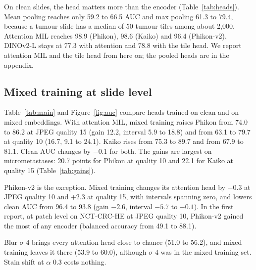 \documentclass[11pt,a4paper]{article}
\newcommand{\ra}{$\rightarrow$}
\begin{document}
On clean slides, the head matters more than the encoder (Table~\ref{tab:heads}). Mean pooling reaches only 59.2 to 66.5 AUC and max pooling 61.3 to 79.4, because a tumour slide has a median of 50 tumour tiles among about 2,000. Attention MIL reaches 98.9 (Phikon), 98.6 (Kaiko) and 96.4 (Phikon-v2). DINOv2-L stays at 77.3 with attention and 78.8 with the tile head. We report attention MIL and the tile head from here on; the pooled heads are in the appendix.

\begin{table}[h]\centering\small
\caption{Clean test slides, heads trained on clean embeddings. Slide AUC in \%, mean $\pm$ standard deviation over five seeds.}
\label{tab:heads}

\end{table}

\subsection{Mixed training at slide level}

Table~\ref{tab:main} and Figure~\ref{fig:auc} compare heads trained on clean and on mixed embeddings. With attention MIL, mixed training raises Phikon from 74.0 to 86.2 at JPEG quality 15 (gain 12.2, interval 5.9 to 18.8) and from 63.1 to 79.7 at quality 10 (16.7, 9.1 to 24.1). Kaiko rises from 75.3 to 89.7 and from 67.9 to 81.1. Clean AUC changes by $-0.1$ for both. The gains are largest on micrometastases: 20.7 points for Phikon at quality 10 and 22.1 for Kaiko at quality 15 (Table~\ref{tab:gains}).

Phikon-v2 is the exception. Mixed training changes its attention head by $-0.3$ at JPEG quality 10 and $+2.3$ at quality 15, with intervals spanning zero, and lowers clean AUC from 96.4 to 93.8 (gain $-2.6$, interval $-5.7$ to $-0.1$). In the first report, at patch level on NCT-CRC-HE at JPEG quality 10, Phikon-v2 gained the most of any encoder (balanced accuracy from 49.1 to 88.1).

Blur $\sigma$ 4 brings every attention head close to chance (51.0 to 56.2), and mixed training leaves it there (53.9 to 60.0), although $\sigma$ 4 was in the mixed training set. Stain shift at $\alpha$ 0.3 costs nothing.

\begin{table}[h]\centering\small
\caption{Slide AUC in \%, all 129 test slides, mean of five seeds: head trained on clean embeddings \ra{} head trained on mixed embeddings. JPEG Q10 was not in the mixed training set.}
\label{tab:main}

\end{table}
\end{document}
